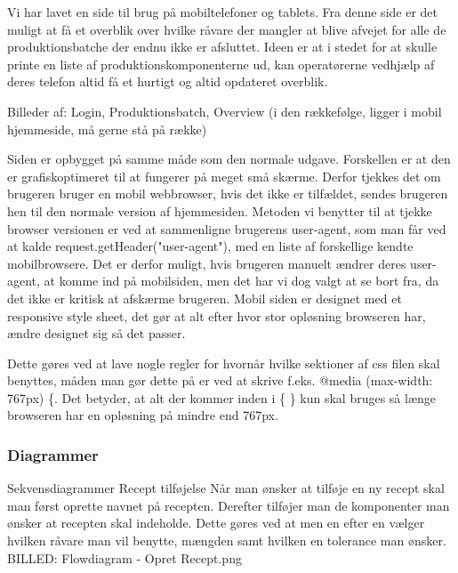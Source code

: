 \documentclass[a4paper]{article}
\begin{document}
Vi har lavet en side til brug på mobiltelefoner og tablets. Fra denne side er det muligt at få et overblik over hvilke råvare der mangler at blive afvejet for alle de produktionsbatche der endnu ikke er afsluttet. Ideen er at i stedet for at skulle printe en liste af produktionskomponenterne ud, kan operatørerne vedhjælp af deres telefon altid få et hurtigt og altid opdateret overblik. 

\begin{center}
  Billeder af: Login, Produktionsbatch, Overview (i den rækkefølge, ligger i mobil hjemmeside, må gerne stå på række)
\end{center}

Siden er opbygget på samme måde som den normale udgave. Forskellen er at den er grafiskoptimeret til at fungerer på meget små skærme. Derfor tjekkes det om brugeren bruger en mobil webbrowser, hvis det ikke er tilfældet, sendes brugeren hen til den normale version af hjemmesiden. Metoden vi benytter til at tjekke browser versionen er ved at sammenligne brugerens user-agent, som man får ved at kalde request.getHeader("user-agent"), med en liste af forskellige kendte mobilbrowsere. Det er derfor muligt, hvis brugeren manuelt ændrer deres user-agent, at komme ind på mobilsiden, men det har vi dog valgt at se bort fra, da det ikke er kritisk at afskærme brugeren.  Mobil siden er designet med et responsive style sheet, det gør at alt efter hvor stor opløsning browseren har, ændre designet sig så det passer.

Dette gøres ved at lave nogle regler for hvornår hvilke sektioner af css filen skal benyttes, måden man gør dette på er ved at skrive f.eks. @media (max-width: 767px) \{. Det betyder, at alt der kommer inden i \{ \} kun skal bruges så længe browseren har en opløsning på mindre end 767px.


\subsubsection{Diagrammer} %

Sekvensdiagrammer
Recept tilføjelse
Når man ønsker at tilføje en ny recept skal man først oprette navnet på recepten. Derefter tilføjer man de komponenter man ønsker at recepten skal indeholde. Dette gøres ved at men en efter en vælger hvilken råvare man vil benytte, mængden samt hvilken en tolerance man ønsker. 
BILLED: Flowdiagram - Opret Recept.png


\end{document}
